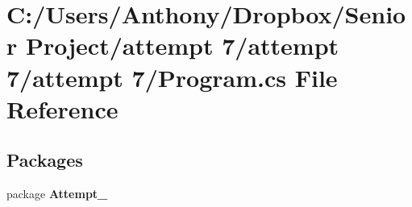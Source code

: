\section{C:/Users/Anthony/Dropbox/Senior Project/attempt 7/attempt 7/attempt 7/Program.cs File Reference}
\label{_program_8cs}
\subsection*{Packages}
\begin{DoxyCompactItemize}
\item 
package {\bf Attempt\_}
\end{DoxyCompactItemize}
